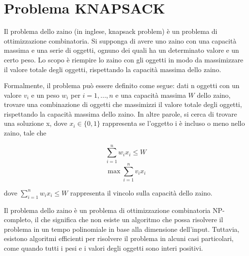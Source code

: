 \chapter{Problema KNAPSACK}
Il problema dello zaino (in inglese, knapsack problem) è un problema di ottimizzazione combinatoria. Si supponga di avere uno zaino con una capacità massima e una serie di oggetti, ognuno dei quali ha un determinato valore e un certo peso. Lo scopo è riempire lo zaino con gli oggetti in modo da massimizzare il valore totale degli oggetti, rispettando la capacità massima dello zaino.

Formalmente, il problema può essere definito come segue: dati n oggetti con un valore $v_i$ e un peso $w_i$ per $i = 1,...,n$ e una capacità massima $W$ dello zaino, trovare una combinazione di oggetti che massimizzi il valore totale degli oggetti, rispettando la capacità massima dello zaino. In altre parole, si cerca di trovare una soluzione x, dove $x_i \in \{0,1\}$ rappresenta se l'oggetto i è incluso o meno nello zaino, tale che

$$\sum_{i=1}^n w_i x_i \le W$$
$$\max \sum_{i=1}^n v_i x_i$$

dove $\sum_{i=1}^n w_i x_i \le W$ rappresenta il vincolo sulla capacità dello zaino.

Il problema dello zaino è un problema di ottimizzazione combinatoria NP-completo, il che significa che non esiste un algoritmo che possa risolvere il problema in un tempo polinomiale in base alla dimensione dell'input. Tuttavia, esistono algoritmi efficienti per risolvere il problema in alcuni casi particolari, come quando tutti i pesi e i valori degli oggetti sono interi positivi.

